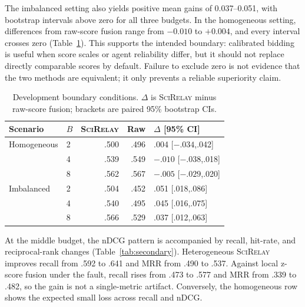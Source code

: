 \documentclass[sigconf]{acmart}
\newcommand{\method}{\textsc{SciRelay}}
\begin{document}
The imbalanced setting also yields positive mean gains of 0.037--0.051, with bootstrap intervals above zero for all three budgets. In the homogeneous setting, differences from raw-score fusion range from $-0.010$ to $+0.004$, and every interval crosses zero (Table~\ref{tab:boundary}). This supports the intended boundary: calibrated bidding is useful when score scales or agent reliability differ, but it should not replace directly comparable scores by default. Failure to exclude zero is not evidence that the two methods are equivalent; it only prevents a reliable superiority claim.

\begin{table}[t]
\caption{Development boundary conditions. $\Delta$ is \method{} minus raw-score fusion; brackets are paired 95\% bootstrap CIs.}
\label{tab:boundary}
\small
\setlength{\tabcolsep}{4.2pt}
\begin{tabular}{llrrl}
\toprule
Scenario & $B$ & \method{} & Raw & $\Delta$ [95\% CI] \\
\midrule
Homogeneous & 2 & .500 & .496 & .004 [$-.034$,.042] \\
 & 4 & .539 & .549 & $-.010$ [$-.038$,.018] \\
 & 8 & .562 & .567 & $-.005$ [$-.029$,.020] \\
Imbalanced & 2 & .504 & .452 & .051 [.018,.086] \\
 & 4 & .540 & .495 & .045 [.016,.075] \\
 & 8 & .566 & .529 & .037 [.012,.063] \\
\bottomrule
\end{tabular}
\end{table}

At the middle budget, the nDCG pattern is accompanied by recall, hit-rate, and reciprocal-rank changes (Table~\ref{tab:secondary}). Heterogeneous \method{} improves recall from .592 to .641 and MRR from .490 to .537. Against local z-score fusion under the fault, recall rises from .473 to .577 and MRR from .339 to .482, so the gain is not a single-metric artifact. Conversely, the homogeneous row shows the expected small loss across recall and nDCG.
\end{document}
